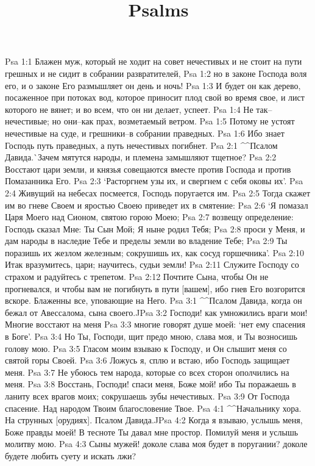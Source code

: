 

\title{Psalms}

Psa 1:1  Блажен муж, который не ходит на совет нечестивых и не стоит на пути грешных и не сидит в собрании развратителей,
Psa 1:2  но в законе Господа воля его, и о законе Его размышляет он день и ночь!
Psa 1:3  И будет он как дерево, посаженное при потоках вод, которое приносит плод свой во время свое, и лист которого не вянет; и во всем, что он ни делает, успеет.
Psa 1:4  Не так--нечестивые; но они--как прах, возметаемый ветром.
Psa 1:5  Потому не устоят нечестивые на суде, и грешники--в собрании праведных.
Psa 1:6  Ибо знает Господь путь праведных, а путь нечестивых погибнет.
Psa 2:1  ^^Псалом Давида.^^ Зачем мятутся народы, и племена замышляют тщетное?
Psa 2:2  Восстают цари земли, и князья совещаются вместе против Господа и против Помазанника Его.
Psa 2:3  `Расторгнем узы их, и свергнем с себя оковы их'.
Psa 2:4  Живущий на небесах посмеется, Господь поругается им.
Psa 2:5  Тогда скажет им во гневе Своем и яростью Своею приведет их в смятение:
Psa 2:6  `Я помазал Царя Моего над Сионом, святою горою Моею;
Psa 2:7  возвещу определение: Господь сказал Мне: Ты Сын Мой; Я ныне родил Тебя;
Psa 2:8  проси у Меня, и дам народы в наследие Тебе и пределы земли во владение Тебе;
Psa 2:9  Ты поразишь их жезлом железным; сокрушишь их, как сосуд горшечника'.
Psa 2:10  Итак вразумитесь, цари; научитесь, судьи земли!
Psa 2:11  Служите Господу со страхом и радуйтесь с трепетом.
Psa 2:12  Почтите Сына, чтобы Он не прогневался, и чтобы вам не погибнуть в пути [вашем], ибо гнев Его возгорится вскоре. Блаженны все, уповающие на Него.
Psa 3:1  ^^Псалом Давида, когда он бежал от Авессалома, сына своего.^^
Psa 3:2  Господи! как умножились враги мои! Многие восстают на меня
Psa 3:3  многие говорят душе моей: `нет ему спасения в Боге'.
Psa 3:4  Но Ты, Господи, щит предо мною, слава моя, и Ты возносишь голову мою.
Psa 3:5  Гласом моим взываю к Господу, и Он слышит меня со святой горы Своей.
Psa 3:6  Ложусь я, сплю и встаю, ибо Господь защищает меня.
Psa 3:7  Не убоюсь тем народа, которые со всех сторон ополчились на меня.
Psa 3:8  Восстань, Господи! спаси меня, Боже мой! ибо Ты поражаешь в ланиту всех врагов моих; сокрушаешь зубы нечестивых.
Psa 3:9  От Господа спасение. Над народом Твоим благословение Твое.
Psa 4:1  ^^Начальнику хора. На струнных [орудиях]. Псалом Давида.^^
Psa 4:2  Когда я взываю, услышь меня, Боже правды моей! В тесноте Ты давал мне простор. Помилуй меня и услышь молитву мою.
Psa 4:3  Сыны мужей! доколе слава моя будет в поругании? доколе будете любить суету и искать лжи?
